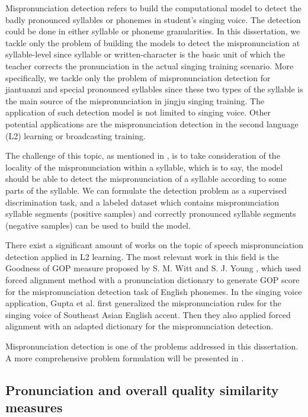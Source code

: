 Mispronunciation detection refers to build the computational model to detect the badly pronounced syllables or phonemes in student's singing voice. The detection could be done in either syllable or phoneme granularities. In this dissertation, we tackle only the problem of building the models to detect the mispronunciation at syllable-level since syllable or written-character is the basic unit of which the teacher corrects the pronunciation in the actual singing training scenario. More specifically, we tackle only the problem of mispronunciation detection for \gls{jiantuanzi} and special pronounced syllables since these two types of the syllable is the main source of the mispronunciation in jingju singing training. The application of such detection model is not limited to singing voice. Other potential applications are the mispronunciation detection in the second language (L2) learning or broadcasting training.

The challenge of this topic, as mentioned in , is to take consideration of the locality of the mispronunciation within a syllable, which is to say, the model should be able to detect the mispronunciation of a syllable according to some parts of the syllable. We can formulate the detection problem as a supervised discrimination task, and a labeled dataset which contains mispronunciation syllable segments (positive samples) and correctly pronounced syllable segments (negative samples) can be used to build the model.

There exist a significant amount of works on the topic of speech mispronunciation detection applied in L2 learning. The most relevant work in this field is the Goodness of \gls{GOP} measure proposed by S. M. Witt and S. J. Young \cite{Witt2000}, which used forced alignment method with a pronunciation dictionary to generate \gls{GOP} score for the mispronunciation detection task of English phonemes. In the singing voice application, Gupta et al. \cite{Guptac} first generalized the mispronunciation rules for the singing voice of Southeast Asian English accent. Then they also applied forced alignment with an adapted dictionary for the mispronunciation detection.

Mispronunciation detection is one of the problems addressed in this dissertation. A more comprehensive problem formulation will be presented in .

\subsection{Pronunciation and overall quality similarity measures}

